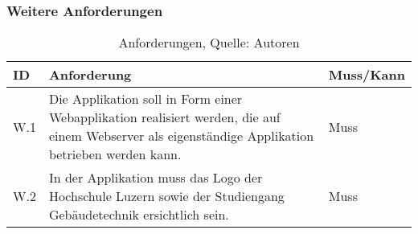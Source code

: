 \subsubsection{Weitere Anforderungen}
\begin{table}[H]
    \setlength\extrarowheight{2pt} %
    \begin{tabularx}{\textwidth}{|l|X|l|}
        \hline
        \textbf{ID} &  \textbf{Anforderung} & \textbf{Muss/Kann}  \\
        \hline
        W.1 & Die Applikation soll in Form einer Webapplikation realisiert werden, die auf einem Webserver als eigenständige Applikation betrieben werden kann. & Muss \\
        \hline
        W.2 & In der Applikation muss das Logo der Hochschule Luzern sowie der Studiengang Gebäudetechnik ersichtlich sein. & Muss \\
        \hline
    \end{tabularx}
    \caption{ \label{tbl: Weitere Anforderungen}Anforderungen, Quelle: Autoren}
\end{table}
\newpage
